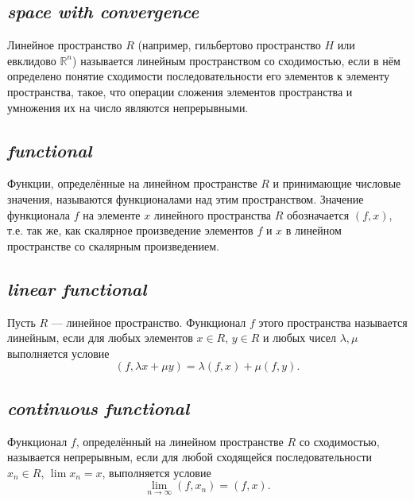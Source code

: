 \subsection*{ \textit{space with convergence}}
\begin{rusblock}
Линейное пространство $R$ (например, гильбертово пространство $H$ или евклидово $\mathbb R^n$) называется линейным пространством со сходимостью, если в нём определено понятие сходимости последовательности его элементов к элементу пространства, такое, что операции сложения элементов пространства и умножения их на число являются непрерывными.
\end{rusblock}

\subsection*{ \textit{functional}}
\begin{rusblock}
Функции, определённые на линейном пространстве $R$ и принимающие числовые значения, называются функционалами над этим пространством. Значение функционала $f$ на элементе $x$ линейного пространства $R$ обозначается $(f,x)$, т.е. так же, как скалярное произведение элементов $f$ и $x$ в линейном пространстве со скалярным произведением.
\end{rusblock}

\subsection*{ \textit{linear functional}}
\begin{rusblock}
Пусть $R$ --- линейное пространство. Функционал $f$ этого пространства называется линейным, если для любых элементов $x\in R$, $y\in R$ и любых чисел $\lambda,\mu$ выполняется условие
\[
(f,\lambda x+\mu y)=\lambda(f,x)+\mu(f,y).
\]
\end{rusblock}

\subsection*{ \textit{continuous functional}}
\begin{rusblock}
Функционал $f$, определённый на линейном пространстве $R$ со сходимостью, называется непрерывным, если для любой сходящейся последовательности $x_n\in R$, $\lim x_n=x$, выполняется условие
\[
\lim_{n\to\infty}(f,x_n)=(f,x).
\]
\end{rusblock}

